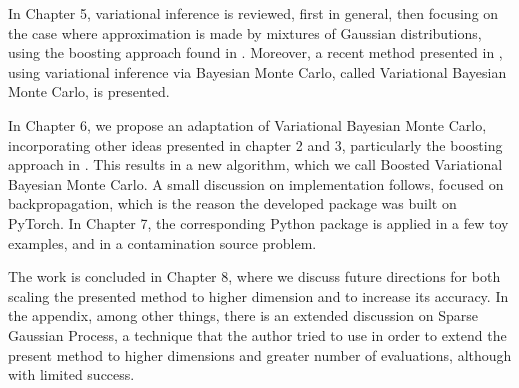 In Chapter 5, variational inference is reviewed, first in general, then focusing on the case where approximation is made by mixtures of Gaussian distributions, using the boosting approach found in \cite{Guo_2016}. Moreover, a recent method presented in \cite{Acerbi_2018}, using variational inference via Bayesian Monte Carlo, called Variational Bayesian Monte Carlo, is presented.

In Chapter 6, we propose an adaptation of Variational Bayesian Monte Carlo, incorporating other ideas presented in chapter 2 and 3, particularly the boosting approach in \cite{Guo_2016}. This results in a new algorithm, which we call Boosted Variational Bayesian Monte Carlo. A small discussion on implementation follows, focused on backpropagation, which is the reason the developed package was built on PyTorch. In Chapter 7, the corresponding Python package is applied in a few toy examples, and in a contamination source problem.

The work is concluded in Chapter 8, where we discuss future directions for both scaling the presented method to higher dimension and to increase its accuracy. In the appendix, among other things, there is an extended discussion on Sparse Gaussian Process, a technique that the author tried to use in order to extend the present method to higher dimensions and greater number of evaluations, although with limited success.